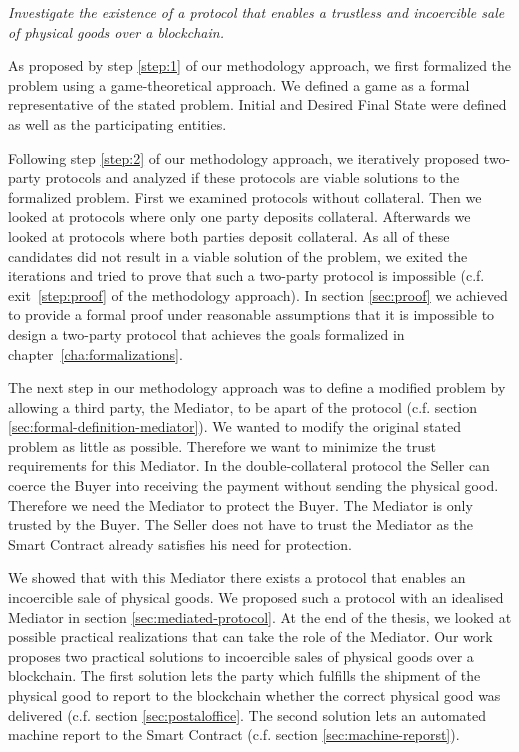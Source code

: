 \documentclass{cacthesis}
\begin{document}
\emph{Investigate the existence of a protocol that enables a trustless and incoercible sale of physical goods over a blockchain.}\newline

 As proposed by step \ref{step:1} of our methodology approach, we first formalized the problem using a game-theoretical approach. We defined a game as a formal representative of the stated problem. Initial and Desired Final State were defined as well as the participating entities.\newline
 
 Following step \ref{step:2} of our methodology approach, we iteratively proposed two-party protocols and analyzed if these protocols are viable solutions to the formalized problem. First we examined protocols without collateral. Then we looked at protocols where only one party deposits collateral.
 Afterwards we looked at protocols where both parties deposit collateral. As all of these candidates did not result in a viable solution of the problem, we exited the iterations and tried to prove that such a two-party protocol is impossible (c.f. exit~\ref{step:proof} of the methodology approach). In section \ref{sec:proof} we achieved to provide a formal proof under reasonable assumptions that it is impossible to design a two-party protocol that achieves the goals formalized in chapter~\ref{cha:formalizations}.\newline
 
  The next step in our methodology approach was to define a modified problem by allowing a third party, the Mediator, to be apart of the protocol (c.f. section \ref{sec:formal-definition-mediator}). We wanted to modify the original stated problem as little as possible. Therefore we want to minimize the trust requirements for this Mediator. In the double-collateral protocol the Seller can coerce the Buyer into receiving the payment without sending the physical good. Therefore we need the Mediator to protect the Buyer. The Mediator is only trusted by the Buyer. The Seller does not have to trust the Mediator as the Smart Contract already satisfies his need for protection.\newline
  
  We showed that with this Mediator there exists a protocol that enables an incoercible sale of physical goods. We proposed such a protocol with an idealised Mediator in section \ref{sec:mediated-protocol}. At the end of the thesis, we looked at possible practical realizations that can take the role of the Mediator. Our work proposes two practical solutions to incoercible sales of physical goods over a blockchain. The first solution lets the party which fulfills the shipment of the physical good to report to the blockchain whether the correct physical good was delivered (c.f. section \ref{sec:postaloffice}. The second solution lets an automated machine report to the Smart Contract (c.f. section \ref{sec:machine-reporst}). \newline
  
\end{document}
